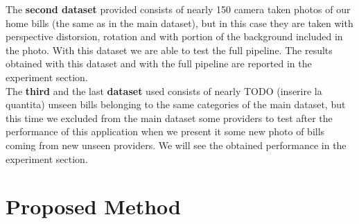 \documentclass[10pt,twocolumn,letterpaper]{article}
\begin{document}
The \textbf{second dataset} provided consists of nearly 150 camera taken photos of our home bills (the same as in the main dataset), but in this case they are taken with perspective distorsion, rotation and with portion of the background included in the photo. With this dataset we are able to test the full pipeline. The results obtained with this dataset and with the full pipeline are reported in the experiment section. \\

The \textbf{third} and the last \textbf{dataset} used consists of nearly TODO (inserire la quantita) unseen bills belonging to the same categories of the main dataset, but this time we excluded from the main dataset some providers to test after the performance of this application when we present it some new photo of bills coming from new unseen providers. We will see the obtained performance in the experiment section.

\section{Proposed Method}
\label{sec:proposed-method}
\end{document}
